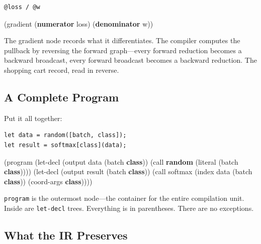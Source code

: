 \documentclass[11pt,titlepage]{article}
\newenvironment{Shaded}{}{}
\newcommand{\KeywordTok}[1]{\textcolor[rgb]{0.00,0.44,0.13}{\textbf{#1}}}
\newcommand{\NormalTok}[1]{#1}
\begin{document}
\begin{verbatim}
@loss / @w
\end{verbatim}

\begin{Shaded}
\begin{Highlighting}[]
\NormalTok{(gradient (}\KeywordTok{numerator}\NormalTok{ loss) (}\KeywordTok{denominator}\NormalTok{ w))}
\end{Highlighting}
\end{Shaded}

The gradient node records what it differentiates. The compiler computes
the pullback by reversing the forward graph---every forward reduction
becomes a backward broadcast, every forward broadcast becomes a backward
reduction. The shopping cart record, read in reverse.

\vspace{2em}

\hypertarget{a-complete-program}{%
\subsection{A Complete Program}\label{a-complete-program}}

Put it all together:

\begin{verbatim}
let data = random([batch, class]);
let result = softmax[class](data);
\end{verbatim}

\begin{Shaded}
\begin{Highlighting}[]
\NormalTok{(program}
\NormalTok{  (let-decl (output data (batch }\KeywordTok{class}\NormalTok{))}
\NormalTok{    (call }\KeywordTok{random}\NormalTok{ (literal (batch }\KeywordTok{class}\NormalTok{))))}
\NormalTok{  (let-decl (output result (batch }\KeywordTok{class}\NormalTok{))}
\NormalTok{    (call softmax (index data (batch }\KeywordTok{class}\NormalTok{))}
\NormalTok{      (coord-args }\KeywordTok{class}\NormalTok{))))}
\end{Highlighting}
\end{Shaded}

\texttt{program} is the outermost node---the container for the entire
compilation unit. Inside are \texttt{let-decl} trees. Everything is in
parentheses. There are no exceptions.

\vspace{2em}

\hypertarget{what-the-ir-preserves}{%
\subsection{What the IR Preserves}\label{what-the-ir-preserves}}
\end{document}
